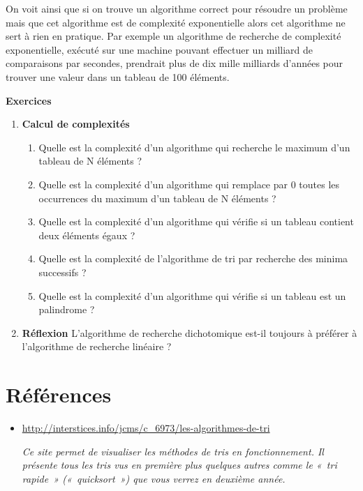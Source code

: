 		On voit ainsi que si on trouve un algorithme correct pour résoudre un
		problème mais que cet algorithme est de complexité exponentielle alors
		cet algorithme ne sert à rien en pratique. Par exemple un algorithme de
		recherche de complexité exponentielle, exécuté sur une machine pouvant
		effectuer un milliard de comparaisons par secondes, prendrait plus de
		dix mille milliards d’années pour trouver une valeur dans un tableau de
		100 éléments.

		{\sffamily\bfseries\upshape
		Exercices}

		\liststyleExercice
		\begin{enumerate}
			\item {\sffamily\bfseries
				Calcul de complexités}
				
				\liststyleNumberingv
				\begin{enumerate}
					\item 
						Quelle est la complexité d'un algorithme qui recherche
						le maximum d'un tableau de N éléments ?
					\item 
						Quelle est la complexité d'un algorithme qui remplace
						par 0 toutes les occurrences du maximum d'un tableau
						de N éléments ?
					\item 
						Quelle est la complexité d'un algorithme qui vérifie si
						un tableau contient deux éléments égaux ?
					\item 
						Quelle est la complexité de l'algorithme de tri par
						recherche des minima successifs ?
					\item 
						Quelle est la complexité d'un algorithme qui vérifie si
						un tableau est un palindrome ?
				\end{enumerate}
				\item {\sffamily\bfseries
					Réflexion}
						L’algorithme de recherche dichotomique est-il toujours à préférer à
						l’algorithme de recherche linéaire ?
				\end{enumerate}

	\section{Références}
		\liststyleListv
		\begin{itemize}
			\item {
				\url{http://interstices.info/jcms/c_6973/les-algorithmes-de-tri}

				\textit{Ce site permet de visualiser les méthodes de tris en
				fonctionnement. Il présente tous les tris vus en première plus quelques
				autres comme le «~tri rapide~» («~quicksort~») que vous verrez en
				deuxième année. }}
		\end{itemize}

